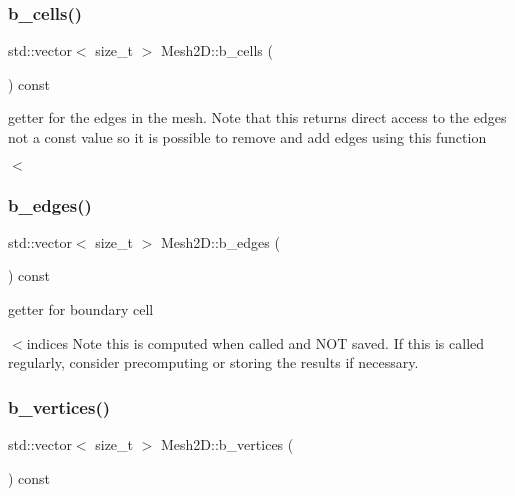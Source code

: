 \subsubsection{\texorpdfstring{b\+\_\+cells()}{b\_cells()}}
{\footnotesize\ttfamily std\+::vector$<$ size\+\_\+t $>$ Mesh2\+D\+::b\+\_\+cells (\begin{DoxyParamCaption}{ }\end{DoxyParamCaption}) const}



getter for the edges in the mesh. Note that this returns direct access to the edges not a const value so it is possible to remove and add edges using this function 

$<$ \mbox{\label{classMeshFramework2D_1_1Mesh2D_abab27bb542a2e79830a4e295384767dd}} 
\subsubsection{\texorpdfstring{b\+\_\+edges()}{b\_edges()}}
{\footnotesize\ttfamily std\+::vector$<$ size\+\_\+t $>$ Mesh2\+D\+::b\+\_\+edges (\begin{DoxyParamCaption}{ }\end{DoxyParamCaption}) const}



getter for boundary cell 

$<$indices Note this is computed when called and N\+OT saved. If this is called regularly, consider precomputing or storing the results if necessary. \mbox{\label{classMeshFramework2D_1_1Mesh2D_ac151935a1581c1aa12fa251ed19ca713}} 
\subsubsection{\texorpdfstring{b\+\_\+vertices()}{b\_vertices()}}
{\footnotesize\ttfamily std\+::vector$<$ size\+\_\+t $>$ Mesh2\+D\+::b\+\_\+vertices (\begin{DoxyParamCaption}{ }\end{DoxyParamCaption}) const}



